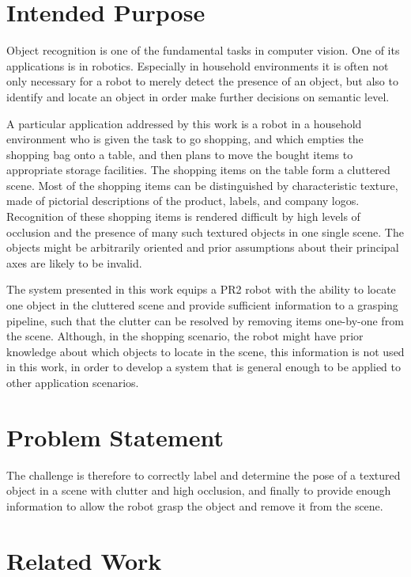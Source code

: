 \section{Intended Purpose}

Object recognition is one of the fundamental tasks in computer vision. One of
its applications is in robotics. Especially in household environments it is
often not only necessary for a robot to merely detect the presence of an
object, but also to identify and locate an object in order make further
decisions on semantic level.

A particular application addressed by this work is a robot in a household
environment who is given the task to go shopping, and which empties the
shopping bag onto a table, and then plans to move the bought items to
appropriate storage facilities. The shopping items on the table form a
cluttered scene. Most of the shopping items can be distinguished by
characteristic texture, made of pictorial descriptions of the product, labels,
and company logos. Recognition of these shopping items is rendered difficult by
high levels of occlusion and the presence of many such textured objects in one
single scene. The objects might be arbitrarily oriented and prior assumptions
about their principal axes are likely to be invalid.

The system presented in this work equips a PR2 robot with the ability to locate
one object in the cluttered scene and provide sufficient information to a
grasping pipeline, such that the clutter can be resolved by removing items
one-by-one from the scene. Although, in the shopping scenario, the robot might
have prior knowledge about which objects to locate in the scene, this
information is not used in this work, in order to develop a system that is
general enough to be applied to other application scenarios.

\section{Problem Statement}

The challenge is therefore to correctly label and determine the pose of a
textured object in a scene with clutter and high occlusion, and finally to
provide enough information to allow the robot grasp the object and remove it
from the scene.

\section{Related Work}

